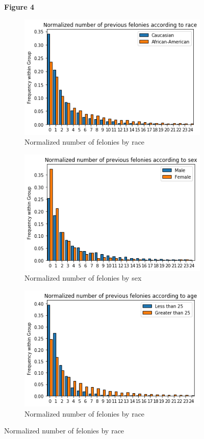 \documentclass[11pt, fleqn, titlepage]{article}
\begin{document}
	\begin{figure}[H]
	\centering
	\textbf{\textbf{Figure 4}}\par\medskip
	\begin{subfigure}{0.5\textwidth}
		\centering
		\includegraphics[width=0.9\linewidth]{"imgs/proirs"}
		\caption{Normalized number of felonies by race}	
		\label{fig:proirs}
	\end{subfigure}%
	\begin{subfigure}{0.5\textwidth}
		\centering
		\includegraphics[width=0.9\linewidth]{"imgs/proirs_sex"}
		\caption{Normalized number of felonies by sex}		
		\label{fig:proirssex}		
	\end{subfigure}
	\begin{subfigure}{0.5\textwidth}
		\centering
		\includegraphics[width=0.9\linewidth]{"imgs/proirs_age"}
		\caption{Normalized number of felonies by race}		
		\label{fig:proirsage}
	\end{subfigure}
	\end{figure}	
\end{document}

